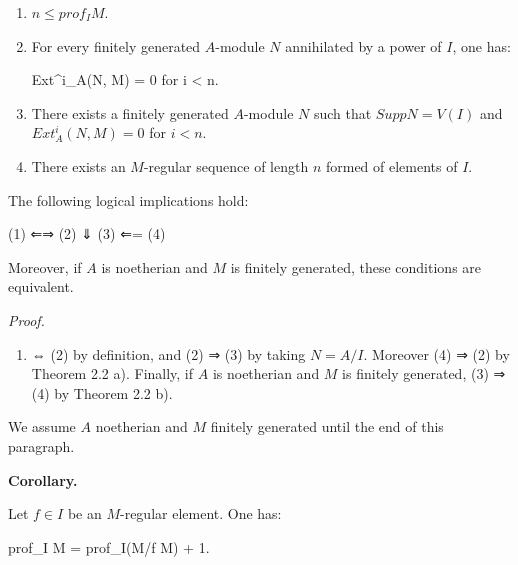 \documentclass[
]{article}
\newenvironment{Shaded}{}{}
\newcommand{\NormalTok}[1]{#1}
\providecommand{\tightlist}{%
  \setlength{\itemsep}{0pt}\setlength{\parskip}{0pt}}
\begin{document}
\begin{enumerate}
\def\labelenumi{\arabic{enumi}.}
\item
  \(n \leqslant prof_{I} M\).
\item
  For every finitely generated \(A\)-module \(N\) annihilated by a power
  of \(I\), one has:

\begin{Shaded}
\begin{Highlighting}[]
\NormalTok{Ext\^{}i\_A(N, M) = 0 for i \textless{} n.}
\end{Highlighting}
\end{Shaded}
\item
  There exists a finitely generated \(A\)-module \(N\) such that
  \(Supp N = V(I)\) and \(Ext^{i}_{A}(N, M) = 0\) for \(i < n\).
\item
  There exists an \(M\)-regular sequence of length \(n\) formed of
  elements of \(I\).
\end{enumerate}

The following logical implications hold:

\begin{Shaded}
\begin{Highlighting}[]
\NormalTok{(1) ⇐⇒ (2)}
\NormalTok{        ⇓}
\NormalTok{       (3) ⇐= (4)}
\end{Highlighting}
\end{Shaded}

Moreover, if \(A\) is noetherian and \(M\) is finitely generated, these
conditions are equivalent.

\emph{Proof.}

\begin{enumerate}
\def\labelenumi{(\arabic{enumi})}
\tightlist
\item
  ⇔ (2) by definition, and (2) ⇒ (3) by taking \(N = A/I\). Moreover (4)
  ⇒ (2) by Theorem 2.2 a). Finally, if \(A\) is noetherian and \(M\) is
  finitely generated, (3) ⇒ (4) by Theorem 2.2 b).
\end{enumerate}

We assume \(A\) noetherian and \(M\) finitely generated until the end of
this paragraph.

\textbf{Corollary.}

Let \(f \in I\) be an \(M\)-regular element. One has:

\begin{Shaded}
\begin{Highlighting}[]
\NormalTok{prof\_I M = prof\_I(M/f M) + 1.}
\end{Highlighting}
\end{Shaded}
\end{document}
